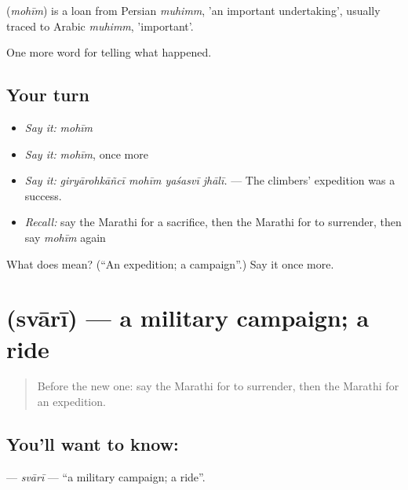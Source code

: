 \begin{cousinweb}
\textbf{} (\emph{mohīm}) is a loan from Persian \emph{muhimm}, 'an important undertaking', usually traced to Arabic \emph{muhimm}, 'important'.
\end{cousinweb}

\begin{grammarlens}[title={What you've built}]
One more word for telling what happened.
\end{grammarlens}

\subsection*{Your turn}
\begin{itemize}
\raggedright
  \item \emph{Say it:} \emph{mohīm}
  \item \emph{Say it:} \emph{mohīm}, once more
  \item \emph{Say it:} \emph{giryārohkāñcī mohīm yaśasvī jhālī.} — The climbers' expedition was a success.
  \item \emph{Recall:} say the Marathi for a sacrifice, then the Marathi for to surrender, then say \emph{mohīm} again
\end{itemize}

\begin{tcolorbox}[breakable,colback=teal!4,colframe=teal!35!black,title={Before you move on}]
What does  mean? (\textquotedblleft{}An expedition; a campaign\textquotedblright{}.) Say it once more.
\end{tcolorbox}
\section[\texorpdfstring{\mr{स्वारी} (svārī)}{स्वारी (svārī)}]{ (svārī) — a military campaign; a ride}

\label{lesson:MR-C333-svari}



\begin{quote}
Before the new one: say the Marathi for to surrender, then the Marathi for an expedition.
\end{quote}

\subsection*{You'll want to know: }
\textbf{} — \emph{svārī} — \textquotedblleft{}a military campaign; a ride\textquotedblright{}.

